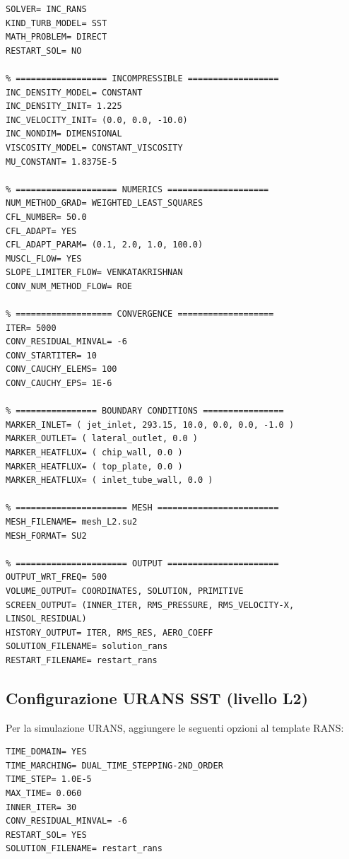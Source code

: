 \documentclass[11pt,a4paper]{article}
\begin{document}
\begin{lstlisting}[style=SU2cfg, caption={Template SU2 per simulazioni RANS SST (livelli L1--L3). Modificare \texttt{MESH\_FILENAME} per cambiare livello di mesh.}, label={lst:rans}]
% ===================== SOLVER =====================
SOLVER= INC_RANS
KIND_TURB_MODEL= SST
MATH_PROBLEM= DIRECT
RESTART_SOL= NO

% ================== INCOMPRESSIBLE ==================
INC_DENSITY_MODEL= CONSTANT
INC_DENSITY_INIT= 1.225
INC_VELOCITY_INIT= (0.0, 0.0, -10.0)
INC_NONDIM= DIMENSIONAL
VISCOSITY_MODEL= CONSTANT_VISCOSITY
MU_CONSTANT= 1.8375E-5

% ==================== NUMERICS ====================
NUM_METHOD_GRAD= WEIGHTED_LEAST_SQUARES
CFL_NUMBER= 50.0
CFL_ADAPT= YES
CFL_ADAPT_PARAM= (0.1, 2.0, 1.0, 100.0)
MUSCL_FLOW= YES
SLOPE_LIMITER_FLOW= VENKATAKRISHNAN
CONV_NUM_METHOD_FLOW= ROE

% =================== CONVERGENCE ===================
ITER= 5000
CONV_RESIDUAL_MINVAL= -6
CONV_STARTITER= 10
CONV_CAUCHY_ELEMS= 100
CONV_CAUCHY_EPS= 1E-6

% ================ BOUNDARY CONDITIONS ================
MARKER_INLET= ( jet_inlet, 293.15, 10.0, 0.0, 0.0, -1.0 )
MARKER_OUTLET= ( lateral_outlet, 0.0 )
MARKER_HEATFLUX= ( chip_wall, 0.0 )
MARKER_HEATFLUX= ( top_plate, 0.0 )
MARKER_HEATFLUX= ( inlet_tube_wall, 0.0 )

% ====================== MESH ========================
MESH_FILENAME= mesh_L2.su2
MESH_FORMAT= SU2

% ====================== OUTPUT ======================
OUTPUT_WRT_FREQ= 500
VOLUME_OUTPUT= COORDINATES, SOLUTION, PRIMITIVE
SCREEN_OUTPUT= (INNER_ITER, RMS_PRESSURE, RMS_VELOCITY-X, LINSOL_RESIDUAL)
HISTORY_OUTPUT= ITER, RMS_RES, AERO_COEFF
SOLUTION_FILENAME= solution_rans
RESTART_FILENAME= restart_rans
\end{lstlisting}

\subsection{Configurazione URANS SST (livello L2)}

Per la simulazione URANS, aggiungere le seguenti opzioni al template RANS:

\begin{lstlisting}[style=SU2cfg, caption={Modifiche aggiuntive per URANS SST (aggiungere al template RANS).}, label={lst:urans}]
% Disabilitare convergenza stazionaria e attivare time-domain
TIME_DOMAIN= YES
TIME_MARCHING= DUAL_TIME_STEPPING-2ND_ORDER
TIME_STEP= 1.0E-5
MAX_TIME= 0.060
INNER_ITER= 30
CONV_RESIDUAL_MINVAL= -6
RESTART_SOL= YES
SOLUTION_FILENAME= restart_rans
\end{lstlisting}
\end{document}
